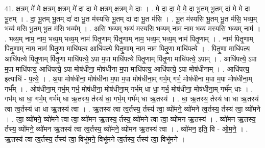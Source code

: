 \documentclass[17pt]{extarticle}
\begin{document}
41. क्ष॒त्रम् मे॑ मे क्ष॒त्रम् क्ष॒त्रम् मे॑ दा दा मे क्ष॒त्रम् क्ष॒त्रम् मे॑ दाः । . मे॒ दा॒ दा॒ मे॒ मे॒ दा॒ भू॒तम् भू॒तम् दा॑ मे मे दा भू॒तम् । . दा॒ भू॒तम् भू॒तम् दा॑ दा भू॒त म॑स्यसि भू॒तम् दा॑ दा भू॒त म॑सि । . भू॒त म॑स्यसि भू॒तम् भू॒त म॑सि॒ भव्य॒म् भव्य॑ मसि भू॒तम् भू॒त म॑सि॒ भव्य᳚म् । . अ॒सि॒ भव्य॒म् भव्य॑ मस्यसि॒ भव्य॒म् नाम॒ नाम॒ भव्य॑ मस्यसि॒ भव्य॒म् नाम॑ । . भव्य॒म् नाम॒ नाम॒ भव्य॒म् भव्य॒म् नाम॑ पितृ॒णाम् पि॑तृ॒णाम् नाम॒ भव्य॒म् भव्य॒म् नाम॑ पितृ॒णाम् । . नाम॑ पितृ॒णाम् पि॑तृ॒णाम् नाम॒ नाम॑ पितृ॒णा माधि॑पत्य॒ आधि॑पत्ये पितृ॒णाम् नाम॒ नाम॑ पितृ॒णा माधि॑पत्ये । . पि॒तृ॒णा माधि॑पत्य॒ आधि॑पत्ये पितृ॒णाम् पि॑तृ॒णा माधि॑पत्ये॒ ऽपा म॒पा माधि॑पत्ये पितृ॒णाम् पि॑तृ॒णा माधि॑पत्ये॒ ऽपाम् । . आधि॑पत्ये॒ ऽपा म॒पा माधि॑पत्य॒ आधि॑पत्ये॒ ऽपा मोष॑धीना॒ मोष॑धीना म॒पा माधि॑पत्य॒ आधि॑पत्ये॒ ऽपा मोष॑धीनाम् । . आधि॑पत्य॒ इत्याधि॑ - प॒त्ये॒ । . अ॒पा मोष॑धीना॒ मोष॑धीना म॒पा म॒पा मोष॑धीना॒म् गर्भ॒म् गर्भ॒ मोष॑धीना म॒पा म॒पा मोष॑धीना॒म् गर्भ᳚म् । . ओष॑धीना॒म् गर्भ॒म् गर्भ॒ मोष॑धीना॒ मोष॑धीना॒म् गर्भ॑म् धा धा॒ गर्भ॒ मोष॑धीना॒ मोष॑धीना॒म् गर्भ॑म् धाः । . गर्भ॑म् धा धा॒ गर्भ॒म् गर्भ॑म् धा ऋ॒तस्य॒ र्तस्य॑ धा॒ गर्भ॒म् गर्भ॑म् धा ऋ॒तस्य॑ । . धा॒ ऋ॒तस्य॒ र्तस्य॑ धा धा ऋ॒तस्य॑ त्वा त्व॒र्तस्य॑ धा धा ऋ॒तस्य॑ त्वा । . ऋ॒तस्य॑ त्वा त्व॒र्तस्य॒ र्तस्य॑ त्वा॒ व्यो॑मने॒ व्यो॑मने त्व॒र्तस्य॒ र्तस्य॑ त्वा॒ व्यो॑मने । . त्वा॒ व्यो॑मने॒ व्यो॑मने त्वा त्वा॒ व्यो॑मन ऋ॒तस्य॒ र्तस्य॒ व्यो॑मने त्वा त्वा॒ व्यो॑मन ऋ॒तस्य॑ । . व्यो॑मन ऋ॒तस्य॒ र्तस्य॒ व्यो॑मने॒ व्यो॑मन ऋ॒तस्य॑ त्वा त्व॒र्तस्य॒ व्यो॑मने॒ व्यो॑मन ऋ॒तस्य॑ त्वा । . व्यो॑मन॒ इति॒ वि - ओ॒म॒ने॒ । . ऋ॒तस्य॑ त्वा त्व॒र्तस्य॒ र्तस्य॑ त्वा॒ विभू॑मने॒ विभू॑मने त्व॒र्तस्य॒ र्तस्य॑ त्वा॒ विभू॑मने । \newline
\pagebreak
{}
\end{document}

